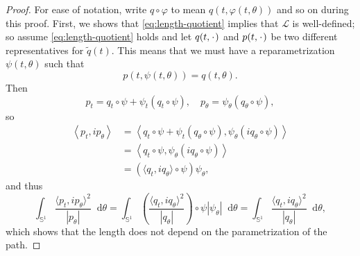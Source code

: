 \message{ !name(tangent_space_of_curves.tex)}\documentclass[a4,danish]{article}
\theoremstyle{break}
\theoremstyle{definition}
\theoremstyle{Break}
\renewcommand{\S}{\mathbb{S}}
\newcommand{\blank}{\makebox[1ex]{\textbf{$\cdot$}}}
\renewcommand{\phi}{\varphi}
\newcommand*\diff{\mathop{}\!\mathrm{d}}
\begin{document}
\begin{proof}
  For ease of notation, write $q \circ \phi$ to mean $q(t, \phi(t,\theta))$ and so on during this proof.
  First, we shows that \eqref{eq:length-quotient} implies that $\mathcal{L}$ is well-defined; so assume \eqref{eq:length-quotient} holds and let $q(t,\blank)$ and $p(t, \blank)$ be two different representatives for $\tilde{q}(t)$. This means that we must have a reparametrization $\psi(t,\theta)$ such that
  \begin{equation*}
    p(t, \psi(t,\theta)) = q(t, \theta).
  \end{equation*}
  Then
  \begin{equation*}
    p_t = q_t\circ \psi + \psi_t (q_t \circ \psi), \quad
    p_{\theta} = \psi_{\theta}(q_{\theta} \circ \psi),
  \end{equation*}
  so
  \begin{equation*}
    \begin{aligned}
      \left\langle
        p_t, i p_{\theta}
      \right\rangle
     &  =     \left\langle
        q_t \circ \psi + \psi_t (q_{\theta} \circ \psi),
        \psi_{\theta} (iq_{\theta} \circ \psi)
      \right\rangle \\
     & =     \left\langle
        q_t \circ \psi,
        \psi_{\theta} (iq_{\theta} \circ \psi)
      \right\rangle \\
      & = (\langle q_t, i q_{\theta}\rangle \circ\psi) \psi_{\theta},
    \end{aligned}
  \end{equation*}
  and thus
  \begin{equation*}
    \int_{\S^1} \frac{\langle p_t, i p_{\theta}\rangle^2}{|p_{\theta}|} \diff \theta
    =
    \int_{\S^1} 
    \left(
      \frac{\langle q_t, i q_{\theta}\rangle^2}{|q_{\theta}|}
    \right) \circ \psi |\psi_{\theta}| \diff \theta
    =    \int_{\S^1} 
      \frac{\langle q_t, i q_{\theta}\rangle^2}{|q_{\theta}|}  \diff \theta,
    \end{equation*}
    which shows that the length does not depend on the parametrization of the path.


\end{proof}
\end{document}
